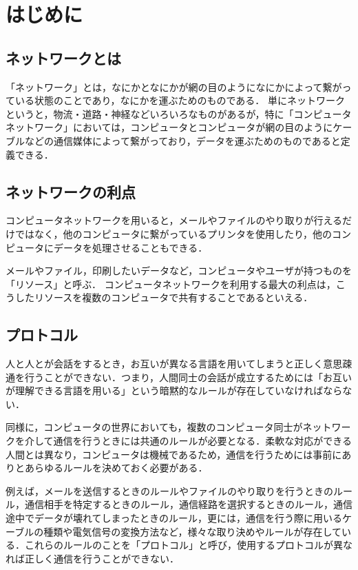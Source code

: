 \section{はじめに}

\subsection{ネットワークとは}

	「ネットワーク」とは，なにかとなにかが網の目のようになにかによって繋がっている状態のことであり，なにかを運ぶためのものである．
	単にネットワークというと，物流・道路・神経などいろいろなものがあるが，特に「コンピュータネットワーク」においては，コンピュータとコンピュータが網の目のようにケーブルなどの通信媒体によって繋がっており，データを運ぶためのものであると定義できる．

\subsection{ネットワークの利点}

	コンピュータネットワークを用いると，メールやファイルのやり取りが行えるだけではなく，他のコンピュータに繋がっているプリンタを使用したり，他のコンピュータにデータを処理させることもできる．

	メールやファイル，印刷したいデータなど，コンピュータやユーザが持つものを「リソース」と呼ぶ．
コンピュータネットワークを利用する最大の利点は，こうしたリソースを複数のコンピュータで共有することであるといえる．


\subsection{プロトコル}
	人と人とが会話をするとき，お互いが異なる言語を用いてしまうと正しく意思疎通を行うことができない．つまり，人間同士の会話が成立するためには「お互いが理解できる言語を用いる」という暗黙的なルールが存在していなければならない．
	
	同様に，コンピュータの世界においても，複数のコンピュータ同士がネットワークを介して通信を行うときには共通のルールが必要となる．柔軟な対応ができる人間とは異なり，コンピュータは機械であるため，通信を行うためには事前にありとあらゆるルールを決めておく必要がある．
	
	例えば，メールを送信するときのルールやファイルのやり取りを行うときのルール，通信相手を特定するときのルール，通信経路を選択するときのルール，通信途中でデータが壊れてしまったときのルール，更には，通信を行う際に用いるケーブルの種類や電気信号の変換方法など，様々な取り決めやルールが存在している．これらのルールのことを「プロトコル」と呼び，使用するプロトコルが異なれば正しく通信を行うことができない．